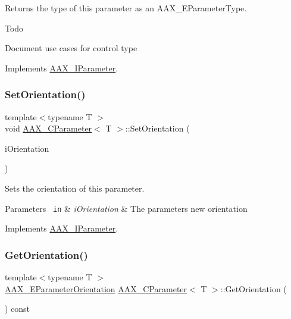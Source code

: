 Returns the type of this parameter as an A\+A\+X\+\_\+\+E\+Parameter\+Type. 

\begin{DoxyRefDesc}{Todo}
\item[\mbox{\hyperlink{a00785__todo000049}{Todo}}]Document use cases for control type \end{DoxyRefDesc}


Implements \mbox{\hyperlink{a01857_a0c096b4092b2146d9aa0413bceeaac48}{A\+A\+X\+\_\+\+I\+Parameter}}.

\mbox{\label{a01537_a99f0a049099f10a0b2e71329a3d75e9a}} 
\subsubsection{\texorpdfstring{SetOrientation()}{SetOrientation()}}
{\footnotesize\ttfamily template$<$typename T $>$ \\
void \mbox{\hyperlink{a01537}{A\+A\+X\+\_\+\+C\+Parameter}}$<$ T $>$\+::Set\+Orientation (\begin{DoxyParamCaption}\item[{\mbox{\hyperlink{a00491_a52f91d1c14aa5dceedabfb9d2de31bf0}{A\+A\+X\+\_\+\+E\+Parameter\+Orientation}}}]{i\+Orientation }\end{DoxyParamCaption})\hspace{0.3cm}{\ttfamily [virtual]}}



Sets the orientation of this parameter. 


\begin{DoxyParams}[1]{Parameters}
\mbox{\texttt{ in}}  & {\em i\+Orientation} & The parameter\textquotesingle{}s new orientation \\
\hline
\end{DoxyParams}


Implements \mbox{\hyperlink{a01857_ac8ba9ed15da3c235ef9844177e1cf6d0}{A\+A\+X\+\_\+\+I\+Parameter}}.

\mbox{\label{a01537_a892d8a5a49ead3b3f922831a46744899}} 
\subsubsection{\texorpdfstring{GetOrientation()}{GetOrientation()}}
{\footnotesize\ttfamily template$<$typename T $>$ \\
\mbox{\hyperlink{a00491_a52f91d1c14aa5dceedabfb9d2de31bf0}{A\+A\+X\+\_\+\+E\+Parameter\+Orientation}} \mbox{\hyperlink{a01537}{A\+A\+X\+\_\+\+C\+Parameter}}$<$ T $>$\+::Get\+Orientation (\begin{DoxyParamCaption}{ }\end{DoxyParamCaption}) const\hspace{0.3cm}{\ttfamily [virtual]}}



